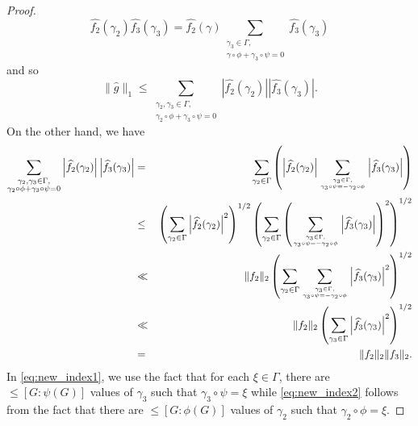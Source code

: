 \begin{proof}
\begin{equation*}
\widehat{f_2}(\gamma_2) \widehat{f_3}(\gamma_3) =
\widehat{f_2}(\gamma) \sum_{\substack{\gamma_3 \in \Gamma, \\ \gamma \circ \phi + \gamma_3 \circ \psi = 0}}  \widehat{f_3}(\gamma_3)
\end{equation*}
and so
\begin{equation*} %
\| \widehat{g} \|_{1} \leq \sum_{\substack{\gamma_2, \gamma_3 \in \Gamma, \\ \gamma_2 \circ \phi + \gamma_3 \circ \psi = 0}} \left| \widehat{f_2}(\gamma_2) \right| \left| \widehat{f_3}(\gamma_3) \right|.
\end{equation*}
On the other hand, we have
\begin{eqnarray}
\sum_{\substack{\gamma_2, \gamma_3 \in \Gamma, \\ \gamma_2 \circ \phi + \gamma_3 \circ \psi = 0}} \left| \widehat{f_2}(\gamma_2) \right| \left| \widehat{f_3}(\gamma_3) \right| &=& \sum_{\gamma_2 \in \Gamma} \left( \left| \widehat{f_2}(\gamma_2) \right| \sum_{\gamma_3 \in \Gamma, \atop{\gamma_3 \circ \psi = - \gamma_2 \circ \phi}} \left| \widehat{f_3}(\gamma_3) \right|\right) \nonumber\\
&\leq& \left( \sum_{\gamma_2 \in \Gamma} \left| \widehat{f_2}(\gamma_2) \right|^2 \right)^{1/2} \left( \sum_{\gamma_2 \in \Gamma} \left( \sum_{\gamma_3 \in \Gamma, \atop{\gamma_3 \circ \psi = - \gamma_2 \circ \phi}} \left| \widehat{f_3}(\gamma_3) \right| \right)^2 \right)^{1/2} \nonumber \\
&\ll& \lVert f_2 \rVert_2 \left( \sum_{\gamma_2 \in \Gamma} \sum_{\gamma_3 \in \Gamma,\atop{\gamma_3 \circ \psi = - \gamma_2 \circ \phi}} \left|  \widehat{f_3}(\gamma_3) \right|^2 \right)^{1/2} \label{eq:new_index1} \\
&\ll& \lVert f_2 \rVert_2 \left( \sum_{\gamma_3 \in \Gamma} \left| \widehat{f_3}(\gamma_3) \right|^2 \right)^{1/2} \label{eq:new_index2} \\
&=& \lVert f_2 \rVert_2 \lVert f_3 \rVert_2. \nonumber
\end{eqnarray}
In \eqref{eq:new_index1}, we use the fact that for each $\xi \in \Gamma$, there are $\leq [G: \psi(G)]$ values of $\gamma_3$ such that $\gamma_3 \circ \psi = \xi$ while \eqref{eq:new_index2} follows from the fact that there are $\leq [G: \phi(G)]$ values of $\gamma_2$ such that $\gamma_2 \circ \phi = \xi$.
\end{proof}
